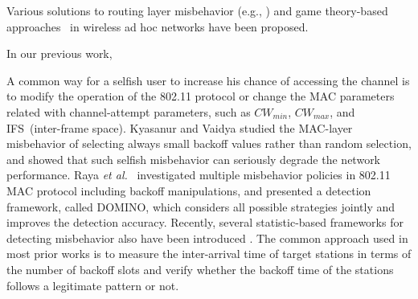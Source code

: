 Various solutions to routing layer misbehavior
(e.g., \cite{BenSalem03, Marti03})
and game theory-based approaches~\cite{MacKenzie01,Akella02} in wireless
ad hoc networks have been proposed.








In our previous work,


A common way for a selfish user to increase his chance of accessing
the channel is to modify the operation of the 802.11 protocol
or change the MAC parameters related with
channel-attempt parameters, such as $CW_{min}$,
$CW_{max}$, and IFS~(inter-frame space).
Kyasanur and Vaidya \cite{Kysanur:Vaidya05} studied the MAC-layer misbehavior
of selecting always small backoff values rather than
random selection, and showed that such selfish misbehavior can
seriously degrade the network performance.
Raya {\em et al.}~\cite{Raya-DOMINO} investigated
multiple misbehavior policies in 802.11 MAC protocol including
backoff manipulations, and presented a detection framework, called DOMINO,
which considers all possible strategies jointly and improves the detection accuracy.
Recently, several statistic-based frameworks for detecting misbehavior
also have been introduced \cite{Radosavac-Wise05, Rong-Infocom06, Toledo:Wang07a}.
The common approach used in most prior works\cite{Kysanur:Vaidya05, Radosavac-Wise05,
Raya-DOMINO, Toledo:Wang07a} is to measure the inter-arrival time of target stations
in terms of the number of backoff slots and verify whether the backoff time of the stations follows a legitimate pattern or not.



